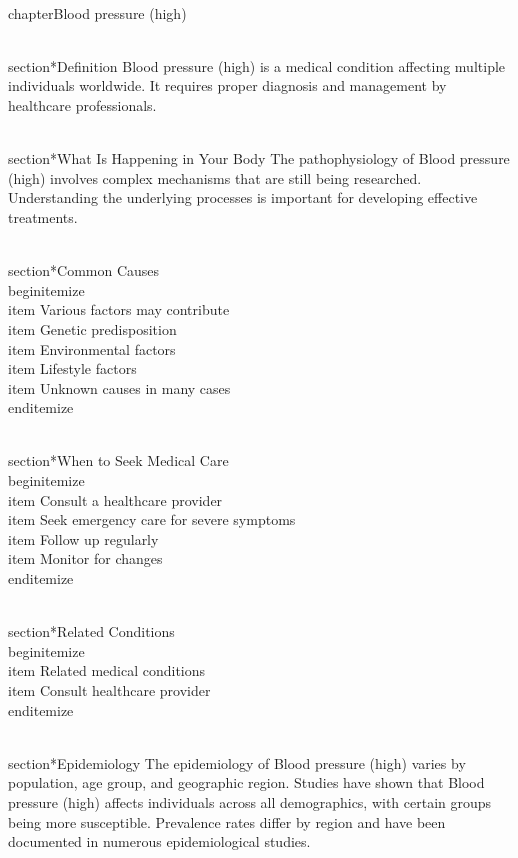 
\\chapter{Blood pressure (high)}

\\section*{Definition}
Blood pressure (high) is a medical condition affecting multiple individuals worldwide. It requires proper diagnosis and management by healthcare professionals.

\\section*{What Is Happening in Your Body}
The pathophysiology of Blood pressure (high) involves complex mechanisms that are still being researched. Understanding the underlying processes is important for developing effective treatments.

\\section*{Common Causes}
\\begin{itemize}
\\item Various factors may contribute\n  \\item Genetic predisposition\n  \\item Environmental factors\n  \\item Lifestyle factors\n  \\item Unknown causes in many cases
\\end{itemize}

\\section*{When to Seek Medical Care}
\\begin{itemize}
\\item Consult a healthcare provider\n  \\item Seek emergency care for severe symptoms\n  \\item Follow up regularly\n  \\item Monitor for changes
\\end{itemize}

\\section*{Related Conditions}
\\begin{itemize}
\\item Related medical conditions\n  \\item Consult healthcare provider
\\end{itemize}

\\section*{Epidemiology}
The epidemiology of Blood pressure (high) varies by population, age group, and geographic region. Studies have shown that Blood pressure (high) affects individuals across all demographics, with certain groups being more susceptible. Prevalence rates differ by region and have been documented in numerous epidemiological studies.

